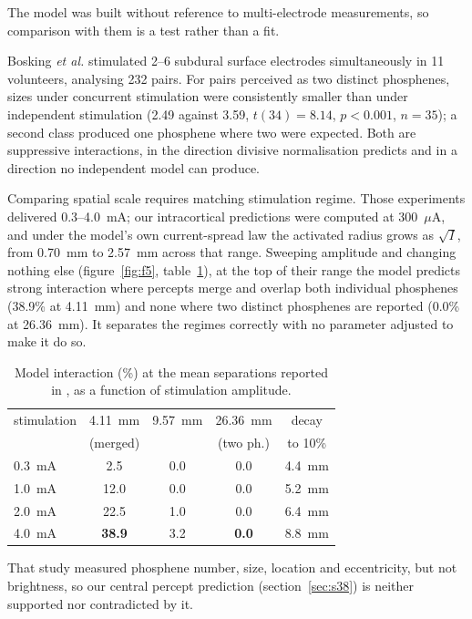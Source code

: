 \documentclass[10pt,twocolumn]{article}
\newcommand{\uA}{\ensuremath{\mu\text{A}}}
\begin{document}
The model was built without reference to multi-electrode measurements, so
comparison with them is a test rather than a fit.

Bosking \textit{et al.} \citep{bosking2022} stimulated 2--6 subdural surface
electrodes simultaneously in 11 volunteers, analysing 232 pairs. For pairs
perceived as two distinct phosphenes, sizes under concurrent stimulation
were consistently smaller than under independent stimulation
(2.49\textdegree{} against 3.59\textdegree, $t(34)=8.14$, $p<0.001$,
$n=35$); a second class produced one phosphene where two were expected.
Both are suppressive interactions, in the direction divisive normalisation
predicts and in a direction no independent model can produce.

Comparing spatial scale requires matching stimulation regime. Those
experiments delivered 0.3--4.0~mA; our intracortical predictions were
computed at 300~\uA, and under the model's own current-spread law the
activated radius grows as $\sqrt{I}$, from 0.70~mm to 2.57~mm across that
range. Sweeping amplitude and changing nothing else (figure~\ref{fig:f5},
table~\ref{tab:t2}), at the top of their range the model predicts strong
interaction where percepts merge and overlap both individual phosphenes
(38.9\% at 4.11~mm) and none where two distinct phosphenes are reported
(0.0\% at 26.36~mm). It separates the regimes correctly with no parameter
adjusted to make it do so.

\begin{table}[t]
\centering
\caption{Model interaction (\%) at the mean separations reported in
  \citep{bosking2022}, as a function of stimulation amplitude.}
\label{tab:t2}
\small
\setlength{\tabcolsep}{3.2pt}
\begin{tabular}{lcccc}
\toprule
stimulation & 4.11~mm & 9.57~mm & 26.36~mm & decay \\
            & (merged) &        & (two ph.) & to 10\% \\
\midrule
0.3~mA & 2.5  & 0.0 & 0.0 & 4.4~mm \\
1.0~mA & 12.0 & 0.0 & 0.0 & 5.2~mm \\
2.0~mA & 22.5 & 1.0 & 0.0 & 6.4~mm \\
4.0~mA & \textbf{38.9} & 3.2 & \textbf{0.0} & 8.8~mm \\
\bottomrule
\end{tabular}
\end{table}

That study measured phosphene number, size, location and eccentricity, but
not brightness, so our central percept prediction (section~\ref{sec:s38})
is neither supported nor contradicted by it.
\end{document}
